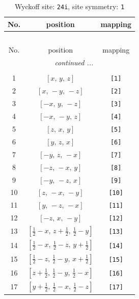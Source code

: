 \documentclass[fleqn,8pt]{jsarticle}
\begin{document}
\begin{longtable}{ccc}
\caption{Wyckoff site: {\tt 24i}, site symmetry: {\tt 1}}
 \\
 \hline \hline
No. & position & mapping \\ \hline \endfirsthead

\multicolumn{2}{l}{\tablename\ \thetable{}} \\
 \hline \hline
No. & position & mapping \\ \hline \endhead

 \hline \hline
\multicolumn{2}{r}{\footnotesize\it continued ...} \\ \endfoot

 \hline \hline
\multicolumn{2}{r}{} \\ \endlastfoot

1 & $\left[ x,\, y,\, z \right]$ & {\tt [1]} \\ \hline
2 & $\left[ x,\, - y,\, - z \right]$ & {\tt [2]} \\ \hline
3 & $\left[ - x,\, y,\, - z \right]$ & {\tt [3]} \\ \hline
4 & $\left[ - x,\, - y,\, z \right]$ & {\tt [4]} \\ \hline
5 & $\left[ z,\, x,\, y \right]$ & {\tt [5]} \\ \hline
6 & $\left[ y,\, z,\, x \right]$ & {\tt [6]} \\ \hline
7 & $\left[ - y,\, z,\, - x \right]$ & {\tt [7]} \\ \hline
8 & $\left[ - z,\, - x,\, y \right]$ & {\tt [8]} \\ \hline
9 & $\left[ - y,\, - z,\, x \right]$ & {\tt [9]} \\ \hline
10 & $\left[ z,\, - x,\, - y \right]$ & {\tt [10]} \\ \hline
11 & $\left[ y,\, - z,\, - x \right]$ & {\tt [11]} \\ \hline
12 & $\left[ - z,\, x,\, - y \right]$ & {\tt [12]} \\ \hline
13 & $\left[ \frac{1}{2} - x,\, z + \frac{1}{2},\, \frac{1}{2} - y \right]$ & {\tt [13]} \\ \hline
14 & $\left[ \frac{1}{2} - x,\, \frac{1}{2} - z,\, y + \frac{1}{2} \right]$ & {\tt [14]} \\ \hline
15 & $\left[ \frac{1}{2} - z,\, \frac{1}{2} - y,\, x + \frac{1}{2} \right]$ & {\tt [15]} \\ \hline
16 & $\left[ z + \frac{1}{2},\, \frac{1}{2} - y,\, \frac{1}{2} - x \right]$ & {\tt [16]} \\ \hline
17 & $\left[ y + \frac{1}{2},\, \frac{1}{2} - x,\, \frac{1}{2} - z \right]$ & {\tt [17]} \\ \hline

\end{longtable}
\end{document}
